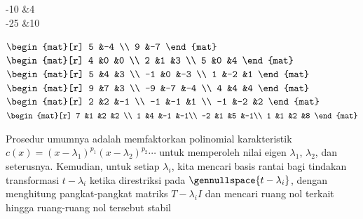 \begin{exercises}
\begin{exparts*}
\begin{mat}[r]
          -10  &4  \\
          -25  &10
        \end{mat} \)
      \partsitem 
        \(
        \begin{mat}[r]
           5   &-4 \\
           9   &-7
        \end{mat} \)
      \partsitem 
        \(
        \begin{mat}[r]
           4   &0    &0  \\
           2   &1    &3  \\
           5   &0    &4
        \end{mat} \)
      \partsitem 
        \(
        \begin{mat}[r]
           5   &4    &3  \\
          -1   &0    &-3 \\
           1   &-2   &1
        \end{mat} \)
      \partsitem
        \(
        \begin{mat}[r]
           9   &7    &3  \\
          -9   &-7   &-4 \\
           4   &4    &4
        \end{mat} \)
      \partsitem 
        \(
        \begin{mat}[r]
           2   &2    &-1 \\
          -1   &-1   &1  \\
          -1   &-2   &2
        \end{mat} \)
      \partsitem 
        \(
        \begin{mat}[r]
           7   &1    &2   &2 \\
           1   &4    &-1  &-1\\
          -2   &1    &5   &-1\\
           1   &1    &2   &8
        \end{mat} \)
    \end{exparts*}
    \begin{answer}
      Prosedur umumnya adalah memfaktorkan polinomial karakteristik
      $c(x)=(x-\lambda_1)^{p_1}(x-\lambda_2)^{p_2}\cdots$
      untuk memperoleh nilai eigen $\lambda_1$, $\lambda_2$, dan seterusnya.
      Kemudian, untuk setiap $\lambda_i$, kita mencari
      basis rantai bagi tindakan transformasi $t-\lambda_i$
      ketika direstriksi pada $\gennullspace{t-\lambda_i}$,
      dengan menghitung pangkat-pangkat matriks $T-\lambda_iI$ dan mencari
      ruang nol terkait hingga ruang-ruang nol tersebut stabil

\end{answer}
\end{exercises}
